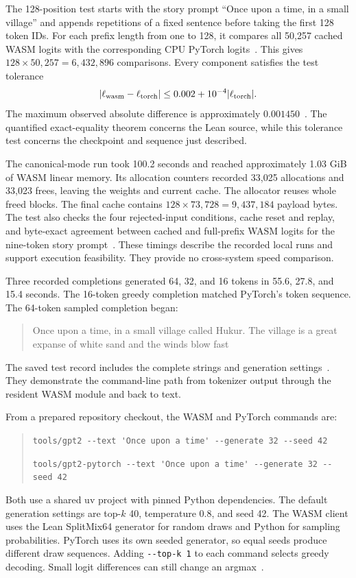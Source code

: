 \documentclass[11pt]{article}
\begin{document}
The 128-position test starts with the story prompt ``Once upon a time, in a small village'' and appends repetitions of a fixed sentence before taking the first 128 token IDs.  For each prefix length from one to 128, it compares all 50,257 cached WASM logits with the corresponding CPU PyTorch logits~\cite{testcode}.  This gives $128\times50{,}257=6{,}432{,}896$ comparisons.  Every component satisfies the test tolerance
\[
|\ell_{\rm wasm}-\ell_{\rm torch}|
\leq 0.002+10^{-4}|\ell_{\rm torch}|.
\]
The maximum observed absolute difference is approximately $0.001450$~\cite{tests}.  The quantified exact-equality theorem concerns the Lean source, while this tolerance test concerns the checkpoint and sequence just described.

The canonical-mode run took 100.2 seconds and reached approximately 1.03 GiB of WASM linear memory.  Its allocation counters recorded 33,025 allocations and 33,023 frees, leaving the weights and current cache.  The allocator reuses whole freed blocks.  The final cache contains $128\times73{,}728=9{,}437{,}184$ payload bytes.  The test also checks the four rejected-input conditions, cache reset and replay, and byte-exact agreement between cached and full-prefix WASM logits for the nine-token story prompt~\cite{tests,testcode}.  These timings describe the recorded local runs and support execution feasibility.  They provide no cross-system speed comparison.

Three recorded completions generated 64, 32, and 16 tokens in 55.6, 27.8, and 15.4 seconds.  The 16-token greedy completion matched PyTorch's token sequence.  The 64-token sampled completion began:
\begin{quote}
Once upon a time, in a small village called Hukur. The village is a great expanse of white sand and the winds blow fast
\end{quote}
The saved test record includes the complete strings and generation settings~\cite{tests}.  They demonstrate the command-line path from tokenizer output through the resident WASM module and back to text.

From a prepared repository checkout, the WASM and PyTorch commands are:
\begin{quote}\small\ttfamily
\verb|tools/gpt2 --text 'Once upon a time' --generate 32 --seed 42|

\verb|tools/gpt2-pytorch --text 'Once upon a time' --generate 32 --seed 42|
\end{quote}
Both use a shared uv project with pinned Python dependencies.  The default generation settings are top-$k$ 40, temperature 0.8, and seed 42.  The WASM client uses the Lean SplitMix64 generator for random draws and Python for sampling probabilities.  PyTorch uses its own seeded generator, so equal seeds produce different draw sequences.  Adding \verb|--top-k 1| to each command selects greedy decoding.  Small logit differences can still change an argmax~\cite{driver}.
\end{document}
